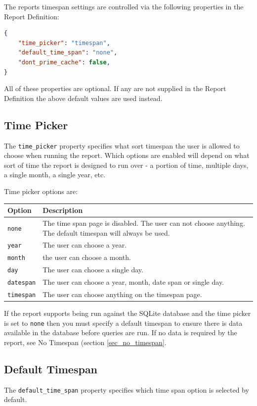 \documentclass[a4paper,10pt]{book}
\begin{document}
The reports timespan settings are controlled via the following properties in the Report Definition:
\begin{lstlisting}[language=json]
{
	"time_picker": "timespan",
	"default_time_span": "none",
	"dont_prime_cache": false,
}
\end{lstlisting}

All of these properties are optional. If any are not supplied in the Report Definition the above default values are used instead.

\subsection{Time Picker}
The \verb|time_picker| property specifies what sort timespan the user is allowed to choose when running the report. Which options are enabled will depend on what sort of time the report is designed to run over - a portion of time, multiple days, a single month, a single year, etc.

Time picker options are:

\begin{tabular}{p{2.5cm} p{11.5cm}}
\hline
\textbf{Option} & \textbf{Description} \\
\hline
\verb|none| & The time span page is disabled. The user can not choose anything. The default timespan will always be used.\\
\verb|year| & The user can choose a year.\\
\verb|month| & the user can choose a month.\\
\verb|day| & The user can choose a single day.\\
\verb|datespan| & The user can choose a year, month, date span or single day.\\
\verb|timespan| & The user can choose anything on the timespan page. \\
\hline
\end{tabular}

If the report supports being run against the SQLite database and the time picker is set to \verb|none| then you must specify a default timespan to ensure there is data available in the database before queries are run. If no data is required by the report, see No Timespan (section \ref{sec_no_timespan}.

\subsection{Default Timespan}
The \verb|default_time_span| property specifies which time span option is selected by default. 
\end{document}
